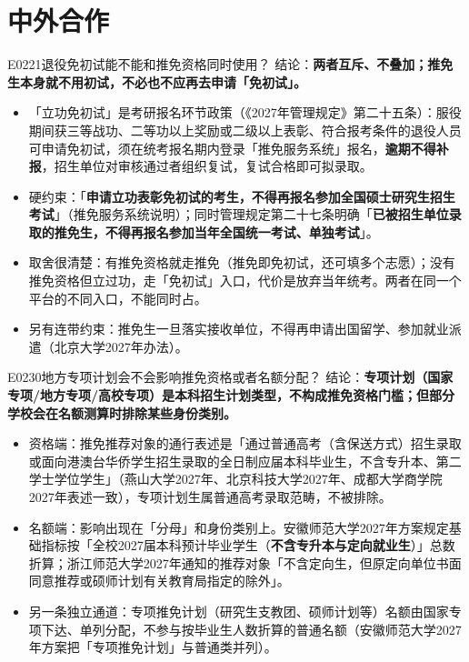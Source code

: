 \section{中外合作}
\begin{qa}{E0221}{退役免初试能不能和推免资格同时使用？}
结论：\textbf{两者互斥、不叠加；推免生本身就不用初试，不必也不应再去申请「免初试」。}
\begin{itemize}
  \item 「立功免初试」是考研报名环节政策（《2027年管理规定》第二十五条）：服役期间获三等战功、二等功以上奖励或二级以上表彰、符合报考条件的退役人员可申请免初试，须在统考报名期内登录「推免服务系统」报名，\textbf{逾期不得补报}，招生单位对审核通过者组织复试，复试合格即可拟录取。
  \item 硬约束：「\textbf{申请立功表彰免初试的考生，不得再报名参加全国硕士研究生招生考试}」（推免服务系统说明）；同时管理规定第二十七条明确「\textbf{已被招生单位录取的推免生，不得再报名参加当年全国统一考试、单独考试}」。
  \item 取舍很清楚：有推免资格就走推免（推免即免初试，还可填多个志愿）；没有推免资格但立过功，走「免初试」入口，代价是放弃当年统考。两者在同一个平台的不同入口，不能同时占。
  \item 另有连带约束：推免生一旦落实接收单位，不得再申请出国留学、参加就业派遣（北京大学2027年办法）。
\end{itemize}
\end{qa}

\begin{qa}{E0230}{地方专项计划会不会影响推免资格或者名额分配？}
结论：\textbf{专项计划（国家专项/地方专项/高校专项）是本科招生计划类型，不构成推免资格门槛；但部分学校会在名额测算时排除某些身份类别。}
\begin{itemize}
  \item 资格端：推免推荐对象的通行表述是「通过普通高考（含保送方式）招生录取或面向港澳台华侨学生招生录取的全日制应届本科毕业生，不含专升本、第二学士学位学生」（燕山大学2027年、北京科技大学2027年、成都大学商学院2027年表述一致），专项计划生属普通高考录取范畴，不被排除。
  \item 名额端：影响出现在「分母」和身份类别上。安徽师范大学2027年方案规定基础指标按「全校2027届本科预计毕业学生（\textbf{不含专升本与定向就业生}）」总数折算；浙江师范大学2027年通知的推荐对象「不含定向生，但原定向单位书面同意推荐或硕师计划有关教育局指定的除外」。
  \item 另一条独立通道：专项推免计划（研究生支教团、硕师计划等）名额由国家专项下达、单列分配，不参与按毕业生人数折算的普通名额（安徽师范大学2027年方案把「专项推免计划」与普通类并列）。
\end{itemize}
\end{qa}

